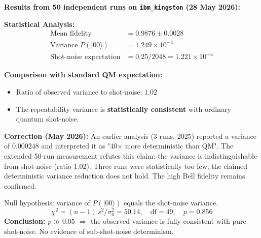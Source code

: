\textbf{Results from 50 independent runs on \texttt{ibm\_kingston} (28 May 2026):}

\begin{table}[h]
	\centering
	\caption{Bell state fidelity: Experimental results (50 runs)}
	\label{tab:bell_fidelity}
\end{table}

\textbf{Statistical Analysis:}
\begin{align}
	\text{Mean fidelity} &= 0.9876 \pm 0.0028 \\
	\text{Variance } P(|00\rangle) &= 1.249 \times 10^{-4} \\
	\text{Shot-noise expectation} &= 0.25/2048 = 1.221 \times 10^{-4}
\end{align}

\textbf{Comparison with standard QM expectation:}
\begin{itemize}
	\item Ratio of observed variance to shot-noise: $1.02$
	\item The repeatability variance is \textbf{statistically consistent} with ordinary quantum shot-noise.
\end{itemize}

\begin{important}
	\textbf{Correction (May 2026):} An earlier analysis (3 runs, 2025) reported a variance of $0.000248$ and interpreted it as "40× more deterministic than QM". The extended 50-run measurement refutes this claim: the variance is indistinguishable from shot-noise (ratio $1.02$). Three runs were statistically too few; the claimed deterministic variance reduction does not hold. The high Bell fidelity remains confirmed.
\end{important}

\begin{keyresult}
	Null hypothesis: variance of $P(|00\rangle)$ equals the shot-noise variance.
	\begin{equation}
		\chi^2 = (n-1)\,s^2/\sigma_0^2 = 50.14, \quad \mathrm{df}=49, \quad p = 0.856
	\end{equation}
	\textbf{Conclusion:} $p \gg 0.05$ $\Rightarrow$ the observed variance is fully consistent with pure shot-noise. No evidence of sub-shot-noise determinism.
\end{keyresult}

